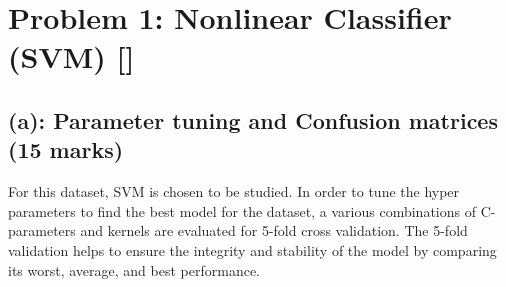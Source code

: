 \documentclass{tron}
\begin{document}
\section{Problem 1: Nonlinear Classifier (SVM) []}
%	
%	
%	
%	
%	

\subsection{(a): Parameter tuning and Confusion matrices (15 marks)}
For this dataset, SVM is chosen to be studied. In order to tune the hyper parameters to find the best model for the dataset, a various combinations of C-parameters and kernels are evaluated for 5-fold cross validation. The 5-fold validation helps to ensure the integrity and stability of the model by comparing its worst, average, and best performance.


\end{document}
